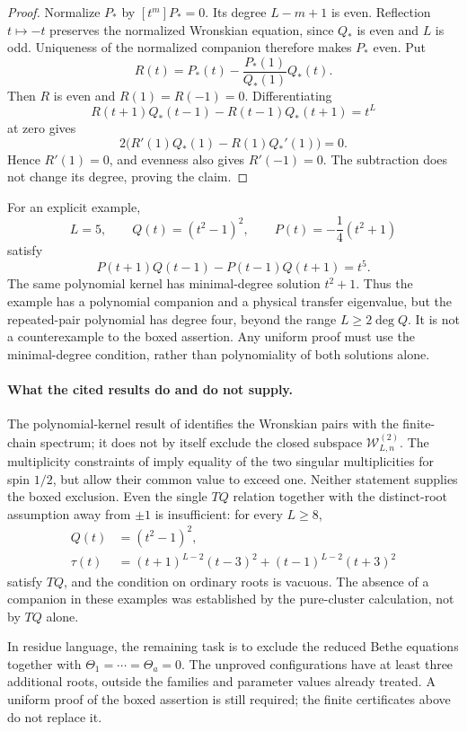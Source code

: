 \documentclass[11pt]{article}
\theoremstyle{definition}
\begin{document}
\begin{proof}
Normalize $P_*$ by $[t^m]P_*=0$. Its degree $L-m+1$ is even.
Reflection $t\mapsto-t$ preserves the normalized Wronskian equation,
since $Q_*$ is even and $L$ is odd. Uniqueness of the normalized
companion therefore makes $P_*$ even. Put
\[
 R(t)=P_*(t)-\frac{P_*(1)}{Q_*(1)}Q_*(t).
\]
Then $R$ is even and $R(1)=R(-1)=0$. Differentiating
\[
 R(t+1)Q_*(t-1)-R(t-1)Q_*(t+1)=t^L
\]
at zero gives
\[
 2\bigl(R'(1)Q_*(1)-R(1)Q_*'(1)\bigr)=0.
\]
Hence $R'(1)=0$, and evenness also gives $R'(-1)=0$.
The subtraction does not change its degree, proving the claim.
\end{proof}

For an explicit example,
\[
 L=5,\qquad Q(t)=(t^2-1)^2,\qquad
 P(t)=-\frac14(t^2+1)
\]
satisfy
\[
 P(t+1)Q(t-1)-P(t-1)Q(t+1)=t^5.
\]
The same polynomial kernel has minimal-degree solution $t^2+1$.
Thus the example has a polynomial companion and a physical transfer
eigenvalue, but the repeated-pair polynomial has degree four, beyond
the range $L\ge2\deg Q$. It is not a counterexample to the boxed
assertion. Any uniform proof must use the minimal-degree condition,
rather than polynomiality of both solutions alone.

\paragraph{What the cited results do and do not supply.}
The polynomial-kernel result of \cite[Section~12.8]{MTV2009}
identifies the Wronskian pairs with the finite-chain spectrum; it
does not by itself exclude the closed subspace
$\mathcal W^{(2)}_{L,n}$. The multiplicity constraints of
\cite[Section~4.2]{HJJ2024} imply equality of the two singular
multiplicities for spin $1/2$, but allow their common value to
exceed one. Neither statement supplies the boxed exclusion.
Even the single $TQ$ relation together with the distinct-root
assumption away from $\pm1$ is insufficient: for every $L\ge8$,
\[
 \begin{aligned}
 Q(t)&=(t^2-1)^2,\\
 \tau(t)&=(t+1)^{L-2}(t-3)^2
            +(t-1)^{L-2}(t+3)^2
 \end{aligned}
\]
satisfy $TQ$, and the condition on ordinary roots is vacuous.
The absence of a companion in these examples was established by
the pure-cluster calculation, not by $TQ$ alone.

In residue language, the remaining task is to exclude the reduced
Bethe equations together with $\Theta_1=\cdots=\Theta_a=0$.
The unproved configurations have at least three additional roots,
outside the families and parameter values already treated. A
uniform proof of the boxed assertion is still required; the finite
certificates above do not replace it.
\end{document}
